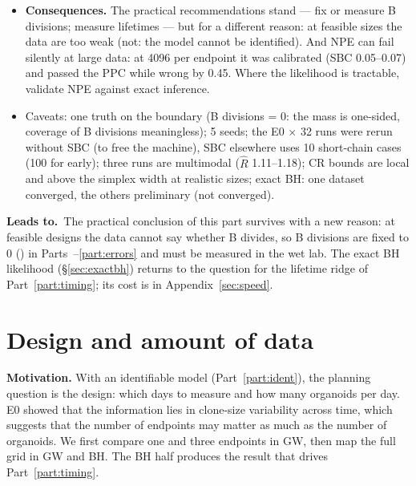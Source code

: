 \documentclass[10pt,a4paper]{article}
\newcommand{\code}[1]{\texttt{\detokenize{#1}}}
\newcommand{\Leads}[1]{\begin{leadbox}{\sffamily\bfseries\color{caqua!70!black}Leads to.}\ #1\end{leadbox}}
\newcommand{\partintro}[1]{\begin{keybox}#1\end{keybox}}
\newcommand{\sref}[1]{\S\ref{#1}}
\begin{document}
\begin{itemize}
\item \textbf{Consequences.} The practical recommendations stand --- fix or measure B divisions; measure lifetimes --- but for a different reason: at feasible sizes the data are too weak (not: the model cannot be identified). And NPE can fail silently at large data: at 4096 per endpoint it was calibrated (SBC 0.05--0.07) and passed the PPC while wrong by 0.45. Where the likelihood is tractable, validate NPE against exact inference.
\item Caveats: one truth on the boundary (B divisions = 0: the mass is one-sided, coverage of B divisions meaningless); 5 seeds; the E0 $\times$ 32 \code{two_type} runs were rerun without SBC (to free the machine), SBC elsewhere uses 10 short-chain cases (100 for early); three runs are multimodal ($\hat R$ 1.11--1.18); CR bounds are local and above the simplex width at realistic sizes; exact BH: one dataset converged, the others preliminary (not converged).
\end{itemize}
\Leads{The practical conclusion of this part survives with a new reason: at feasible designs the data cannot say whether B divides, so B divisions are fixed to 0 (\code{reversible_ab}) in Parts~\ref{part:design}--\ref{part:errors} and must be measured in the wet lab. The exact BH likelihood (\sref{sec:exactbh}) returns to the question for the lifetime ridge of Part~\ref{part:timing}; its cost is in Appendix~\ref{sec:speed}.}


\clearpage
\part{Design and amount of data}\label{part:design}
\partintro{\textbf{Motivation.} With an identifiable model (Part~\ref{part:ident}), the planning question is the design: which days to measure and how many organoids per day. E0 showed that the information lies in clone-size variability across time, which suggests that the number of endpoints may matter as much as the number of organoids. We first compare one and three endpoints in GW, then map the full grid in GW and BH. The BH half produces the result that drives Part~\ref{part:timing}.}
\end{document}

